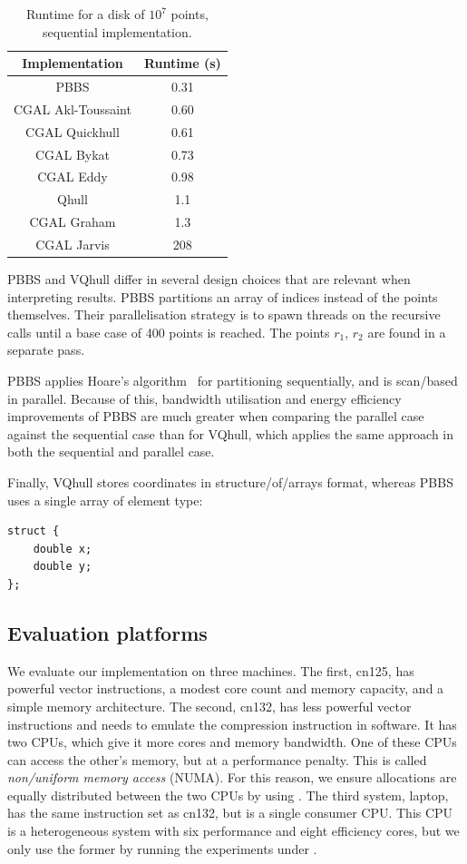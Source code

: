 \begin{table}[ht]
  \centering
  \begin{tabular}{cc}
    \toprule
    Implementation & Runtime (\si{\second}) \\
    \midrule
    PBBS               & 0.31 \\
    CGAL Akl-Toussaint & 0.60 \\
    CGAL Quickhull     & 0.61 \\
    CGAL Bykat         & 0.73 \\
    CGAL Eddy          & 0.98 \\
    Qhull              & 1.1 \\
    CGAL Graham        & 1.3 \\
    CGAL Jarvis        & 208 \\
    \bottomrule
  \end{tabular}%
  \caption{Runtime for a disk of $10^7$ points, sequential implementation.}%
  \label{tab:reference}%
\end{table}

PBBS and VQhull differ in several design choices that are relevant when interpreting results.
PBBS partitions an array of indices instead of the points themselves.
Their parallelisation strategy is to spawn threads on the recursive calls until a base case of \num{400} points is reached.
The points $r_1$, $r_2$ are found in a separate pass.

PBBS applies Hoare's algorithm~\cite{hoare1962quick} for partitioning sequentially, and is scan\-/based~\cite{blelloch1989scans} in parallel.
Because of this, bandwidth utilisation and energy efficiency improvements of PBBS are much greater when comparing the parallel case against the sequential case than for VQhull, which applies the same approach in both the sequential and parallel case.

Finally, VQhull stores coordinates in structure\-/of\-/arrays format, whereas PBBS uses a single array of element type:
\begin{verbatim}
struct {
    double x;
    double y;
};
\end{verbatim}

\subsection{Evaluation platforms}
We evaluate our implementation on three machines.
The first, cn125, has powerful vector instructions, a modest core count and memory capacity, and a simple memory architecture.
The second, cn132, has less powerful vector instructions and needs to emulate the compression instruction in software.
It has two CPUs, which give it more cores and memory bandwidth.
One of these CPUs can access the other's memory, but at a performance penalty.
This is called \emph{non\-/uniform memory access} (NUMA).
For this reason, we ensure allocations are equally distributed between the two CPUs by using .
The third system, laptop, has the same instruction set as cn132, but is a single consumer CPU.
This CPU is a heterogeneous system with six performance and eight efficiency cores, but we only use the former by running the experiments under .

